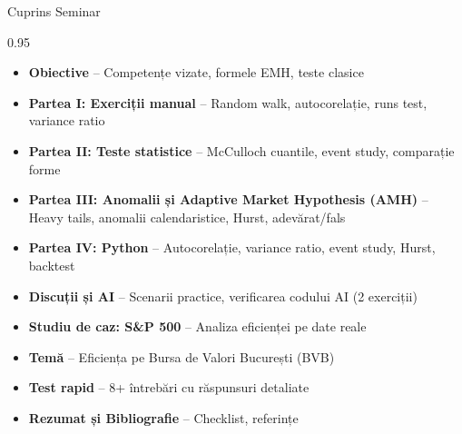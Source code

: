 \documentclass[9pt, aspectratio=169, t]{beamer}
\subtitle{Seminar: Ipoteza Pieței Eficiente (EMH)}
\begin{document}
{
\begin{frame}
    \titlepage
\end{frame}
}

\begin{frame}{Cuprins Seminar}
    \begin{cminipage}{0.95\textwidth}
    \begin{itemize}\setlength{\itemsep}{0pt}
        \item \textbf{Obiective} -- Competențe vizate, formele EMH, teste clasice
        \vspace{0.1cm}
        \item \textbf{Partea I: Exerciții manual} -- Random walk, autocorelație, runs test, variance ratio
        \vspace{0.1cm}
        \item \textbf{Partea II: Teste statistice} -- McCulloch cuantile, event study, comparație forme
        \vspace{0.1cm}
        \item \textbf{Partea III: Anomalii și Adaptive Market Hypothesis (AMH)} -- Heavy tails, anomalii calendaristice, Hurst, adevărat/fals
        \vspace{0.1cm}
        \item \textbf{Partea IV: Python} -- Autocorelație, variance ratio, event study, Hurst, backtest
        \vspace{0.1cm}
        \item \textbf{Discuții și AI} -- Scenarii practice, verificarea codului AI (2 exerciții)
        \vspace{0.1cm}
        \item \textbf{Studiu de caz: S\&P 500} -- Analiza eficienței pe date reale
        \vspace{0.1cm}
        \item \textbf{Temă} -- Eficiența pe Bursa de Valori București (BVB)
        \vspace{0.1cm}
        \item \textbf{Test rapid} -- 8+ întrebări cu răspunsuri detaliate
        \vspace{0.1cm}
        \item \textbf{Rezumat și Bibliografie} -- Checklist, referințe
    \end{itemize}
    \end{cminipage}
\end{frame}
\end{document}
